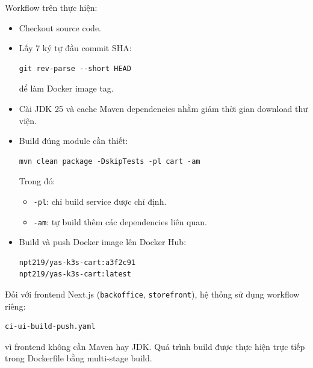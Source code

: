 Workflow trên thực hiện:
\begin{itemize}
    \item Checkout source code.
    
    \item Lấy 7 ký tự đầu commit SHA:
    
\begin{verbatim}
git rev-parse --short HEAD
\end{verbatim}

    để làm Docker image tag.
    
    \item Cài JDK 25 và cache Maven dependencies nhằm giảm thời gian download thư viện.
    
    \item Build đúng module cần thiết:
    
\begin{verbatim}
mvn clean package -DskipTests -pl cart -am
\end{verbatim}

    Trong đó:
    
    \begin{itemize}
        \item \texttt{-pl}: chỉ build service được chỉ định.
        \item \texttt{-am}: tự build thêm các dependencies liên quan.
    \end{itemize}
    
    \item Build và push Docker image lên Docker Hub:
    
\begin{verbatim}
npt219/yas-k3s-cart:a3f2c91
npt219/yas-k3s-cart:latest
\end{verbatim}
\end{itemize}

\vspace{0.5em}

Đối với frontend Next.js (\texttt{backoffice}, \texttt{storefront}), hệ thống sử dụng workflow riêng:

\begin{verbatim}
ci-ui-build-push.yaml
\end{verbatim}

vì frontend không cần Maven hay JDK. Quá trình build được thực hiện trực tiếp trong Dockerfile bằng multi-stage build.

\vspace{0.5em}

